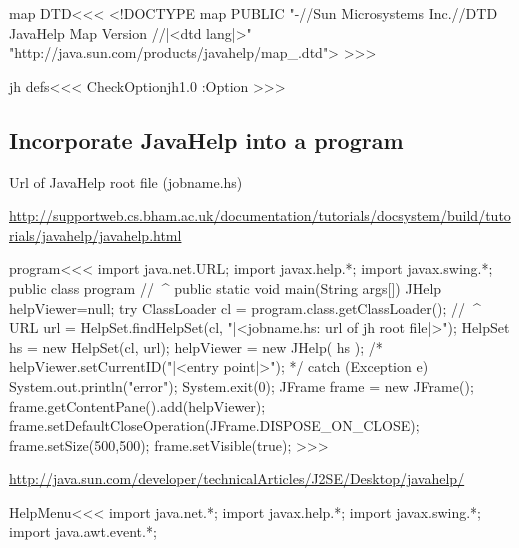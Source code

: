 \<map DTD\><<<
<!DOCTYPE map PUBLIC\Hnewline
     "-//Sun Microsystems Inc.//DTD
                    JavaHelp Map Version \dotVersion//|<dtd lang|>"\Hnewline
     "http://java.sun.com/products/javahelp/map_\subVersion.dtd">  >>>


\<jh defs\><<<
\:CheckOption{jh1.0} \if:Option
   \def\dotVersion{1.0}
   \def\subVersion{1\string_0}
\else
   \def\dotVersion{2.0}
   \def\subVersion{2\string_0}
\fi
>>>







\subsection{Incorporate JavaHelp into a program}

Url of JavaHelp root file (jobname.hs)

\url{http://supportweb.cs.bham.ac.uk/documentation/tutorials/docsystem/build/tutorials/javahelp/javahelp.html}


\<program\><<<
import java.net.URL;
import javax.help.*;
import javax.swing.*;
public class program {
           //^^^^^^^
   public static void main(String args[]) {
      JHelp helpViewer=null;
      try {
         ClassLoader cl = program.class.getClassLoader();
                        //^^^^^^^
         URL url = HelpSet.findHelpSet(cl, 
                              "|<jobname.hs: url of jh root file|>");
         HelpSet hs = new HelpSet(cl, url);
         helpViewer = new JHelp( hs );
         /*
            helpViewer.setCurrentID("|<entry point|>");
         */
      } catch (Exception e) { 
          System.out.println("error"); System.exit(0); 
      }
      JFrame frame = new JFrame();
      frame.getContentPane().add(helpViewer);
      frame.setDefaultCloseOperation(JFrame.DISPOSE_ON_CLOSE);
      frame.setSize(500,500);
      frame.setVisible(true);
   }
}
>>>


\url{http://java.sun.com/developer/technicalArticles/J2SE/Desktop/javahelp/}

\<HelpMenu\><<<
import java.net.*;
import javax.help.*;
import javax.swing.*;
import java.awt.event.*;

